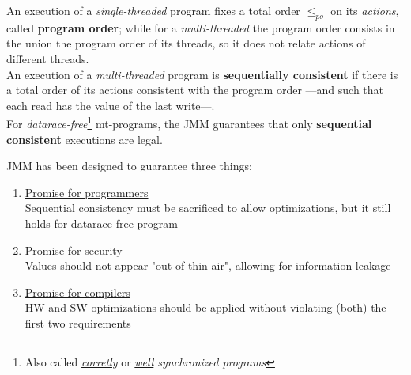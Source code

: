 

An execution of a \textit{single-threaded} program fixes a total order $\leq_{po}$ on its \textit{actions}, called \textbf{program order};
while for a \textit{multi-threaded} the program order consists in the union the program order of its threads,
so it does not relate actions of different threads.\\
An execution of a \textit{multi-threaded} program is \textbf{sequentially consistent} if there is a total order of its actions consistent with the program order {---}and such that each read has the value of the last write{---}.\\
For \textit{datarace-free}\footnote{Also called \textit{\underline{corretly}} or \textit{\underline{well} synchronized programs}} mt-programs, the JMM guarantees that only \textbf{sequential consistent} executions are legal.

{JMM has been designed to guarantee three things:\ns
\begin{enumerate}
   \item \ul{Promise for programmers}\\
   Sequential consistency must be sacrificed to allow optimizations, 
   but it still holds for datarace-free program
   \item \ul{Promise for security}\\
   Values should not appear "out of thin air", allowing for information leakage
   \item \ul{Promise for compilers}\\
   HW and SW optimizations should be applied without violating (both) the first two requirements
\end{enumerate}}

